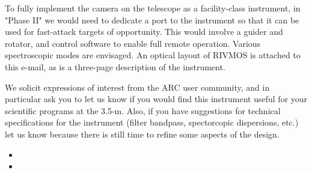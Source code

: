\documentclass{article}
\begin{document}
To fully implement the camera on the telescope as a facility-class 
instrument, in "Phase II" we would need to dedicate a port to the 
instrument so that it can be used for fast-attack targets of 
opportunity.  This would involve a guider and 
rotator, and control software to enable full remote operation. 
Various spectroscopic modes are envisaged.  An optical layout of 
RIVMOS is attached to this e-mail, as is a three-page description of 
the instrument.

We solicit expressions of interest from the ARC user community, and 
in particular ask you to let us know if you would find this 
instrument useful for your scientific programs at the 3.5-m.  Also, 
if you have suggestions for technical specifications for the 
instrument (filter bandpass, spectorcopic dispersions, etc.) let us 
know because there is still time to refine some aspects of the design.

\begin{itemize}
\item {}
\item {}
\end{itemize}
\end{document}
